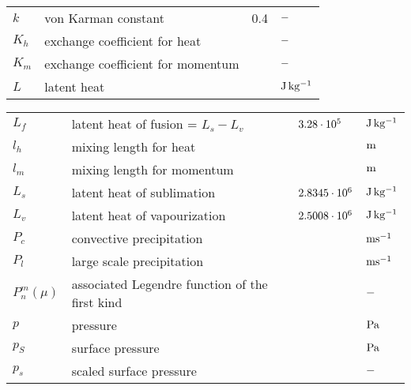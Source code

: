 \begin{tabular*}{\textwidth}{l@{\extracolsep\fill}lll}
$k$       & von Karman constant                   & 0.4          & $\rm -$ \\
$K_h$          & exchange coefficient for heat         &         & $\rm -$ \\
$K_m$          & exchange coefficient for momentum          &         &$\rm -$ \\
$L$       & latent heat                      &         & $\rm J\, kg^{-1}$\\
\end{tabular*}

\newpage
\begin{tabular*}{\textwidth}{l@{\extracolsep\fill}lll}


$L_f$          & latent heat of fusion = $L_s - L_v$        & $\rm 3.28\cdot 10^{5}$   &
$\rm J\, kg^{-1}$ \\
$l_h$          & mixing length for heat                &         & $\rm m$ \\
$l_m$          & mixing length for momentum            &         &
$\rm m$ \\
$L_s$          & latent heat of sublimation            & $\rm 2.8345\cdot 10^{6}$ & $\rm J\,
kg^{-1}$ \\
$L_v$          & latent heat of vapourization               & $\rm 2.5008\cdot 10^{6}$
     & $\rm J\, kg^{-1}$ \\
$P_c$     & convective precipitation    &    &$\rm  m s^{-1}$ \\
$P_l$     & large scale precipitation   &    &$\rm  m s^{-1}$ \\
$P^m_n(\mu)$   & associated Legendre function of the first kind &          & $\rm -$ \\
$p$       & pressure  \hspace*{\fill}             &         & $\rm Pa$ \\
$p_S$          & surface pressure                 &         & $\rm Pa$
\\
$p_s$          & scaled surface pressure               &         & $\rm -$ \\


\end{tabular*}
